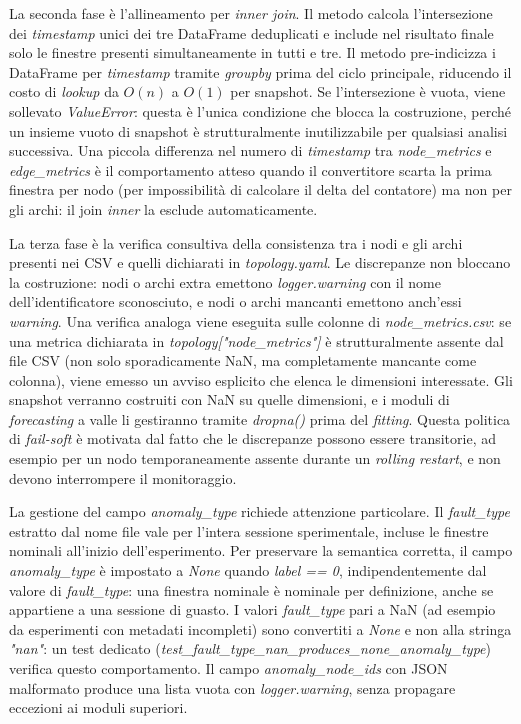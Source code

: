 La seconda fase è l'allineamento per \textit{inner join}. Il metodo calcola l'intersezione dei
\textit{timestamp} unici dei tre DataFrame deduplicati e include nel risultato finale solo le
finestre presenti simultaneamente in tutti e tre. Il metodo pre-indicizza i DataFrame per \textit{timestamp}
tramite \textit{groupby} prima del ciclo principale, riducendo il costo di \textit{lookup} da $O(n)$
a $O(1)$ per snapshot. Se l'intersezione è vuota, viene sollevato \textit{ValueError}: questa è
l'unica condizione che blocca la costruzione, perché un insieme vuoto di snapshot è
strutturalmente inutilizzabile per qualsiasi analisi successiva. Una piccola differenza nel numero
di \textit{timestamp} tra \textit{node\_metrics} e \textit{edge\_metrics} è il comportamento
atteso quando il convertitore scarta la prima finestra per nodo (per impossibilità di calcolare
il delta del contatore) ma non per gli archi: il join \textit{inner} la esclude automaticamente.

La terza fase è la verifica consultiva della consistenza tra i nodi e gli archi presenti nei CSV
e quelli dichiarati in \textit{topology.yaml}. Le discrepanze non bloccano la costruzione: nodi o
archi extra emettono \textit{logger.warning} con il nome dell'identificatore sconosciuto, e nodi
o archi mancanti emettono anch'essi \textit{warning}. Una verifica analoga viene eseguita sulle
colonne di \textit{node\_metrics.csv}: se una metrica dichiarata in
\textit{topology["node\_metrics"]} è strutturalmente assente dal file CSV (non solo
sporadicamente NaN, ma completamente mancante come colonna), viene emesso un avviso esplicito che
elenca le dimensioni interessate. Gli snapshot verranno costruiti con NaN su quelle dimensioni, e
i moduli di \textit{forecasting} a valle li gestiranno tramite \textit{dropna()} prima del
\textit{fitting}. Questa politica di \textit{fail-soft} è motivata dal fatto che le discrepanze
possono essere transitorie, ad esempio per un nodo temporaneamente assente durante un
\textit{rolling restart}, e non devono interrompere il monitoraggio.

La gestione del campo \textit{anomaly\_type} richiede attenzione particolare. Il
\textit{fault\_type} estratto dal nome file vale per l'intera sessione sperimentale, incluse le
finestre nominali all'inizio dell'esperimento. Per preservare la semantica corretta, il campo
\textit{anomaly\_type} è impostato a \textit{None} quando \textit{label == 0},
indipendentemente dal valore di \textit{fault\_type}: una finestra nominale è nominale per
definizione, anche se appartiene a una sessione di guasto. I valori \textit{fault\_type} pari a
NaN (ad esempio da esperimenti con metadati incompleti) sono convertiti a \textit{None} e non
alla stringa \textit{"nan"}: un test dedicato (\textit{test\_fault\_type\_nan\_produces\_none\_anomaly\_type})
verifica questo comportamento. Il campo \textit{anomaly\_node\_ids} con JSON malformato produce
una lista vuota con \textit{logger.warning}, senza propagare eccezioni ai moduli superiori.

